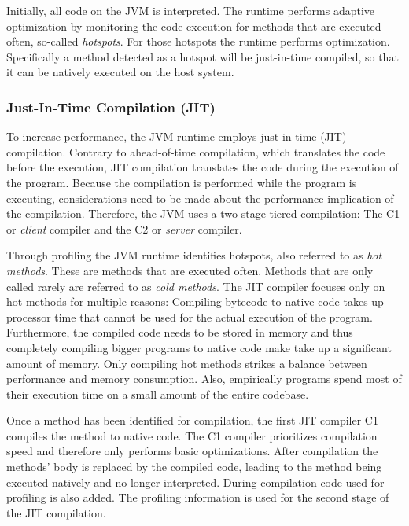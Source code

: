 Initially, all code on the JVM is interpreted. The runtime performs adaptive optimization by monitoring the code execution for methods that are executed often, so-called \textit{hotspots}. For those hotspots the runtime performs optimization. Specifically a method detected as a hotspot will be just-in-time compiled, so that it can be natively executed on the host system. 

\subsubsection{Just-In-Time Compilation (JIT)}

To increase performance, the JVM runtime employs just-in-time (JIT) compilation. Contrary to ahead-of-time compilation, which translates the code before the execution, JIT compilation translates the code during the execution of the program. Because the compilation is performed while the program is executing, considerations need to be made about the performance implication of the compilation. Therefore, the JVM uses a two stage tiered compilation: The C1 or \textit{client} compiler and the C2 or \textit{server} compiler.


Through profiling the JVM runtime identifies hotspots, also referred to as \textit{hot methods}. These are methods that are executed often. Methods that are only called rarely are referred to as \textit{cold methods}. The JIT compiler focuses only on hot methods for multiple reasons: Compiling bytecode to native code takes up processor time that cannot be used for the actual execution of the program. Furthermore, the compiled code needs to be stored in memory and thus completely compiling bigger programs to native code make take up a significant amount of memory. Only compiling hot methods strikes a balance between performance and memory consumption. Also, empirically programs spend most of their execution time on a small amount of the entire codebase. 

Once a method has been identified for compilation, the first JIT compiler C1 compiles the method to native code. The C1 compiler prioritizes compilation speed and therefore only performs basic optimizations. After compilation the methods' body is replaced by the compiled code, leading to the method being executed natively and no longer interpreted. During compilation code used for profiling is also added. The profiling information is used for the second stage of the JIT compilation. 

